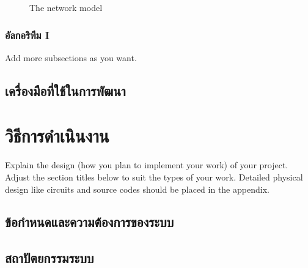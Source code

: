 \documentclass[12pt,oneside,openright,a4paper]{cpe-thai-project}
\begin{document}
\begin{figure}[!h]\centering
\setlength{\fboxrule}{0.2mm} %
\setlength{\fboxsep}{1cm}
\caption{The network model}\label{fig:model2}
\end{figure}

 
\subsection{อัลกอริทึม I}
Add more subsections as you want.


\section{เครื่องมือที่ใช้ในการพัฒนา}

\chapter{วิธีการดำเนินงาน}

Explain the design (how you plan to implement your work) of your project. Adjust the section titles below to suit the types of your work. Detailed physical design like circuits and source codes should be placed in the appendix.

\section{ข้อกำหนดและความต้องการของระบบ}

\section{สถาปัตยกรรมระบบ}
\end{document}
